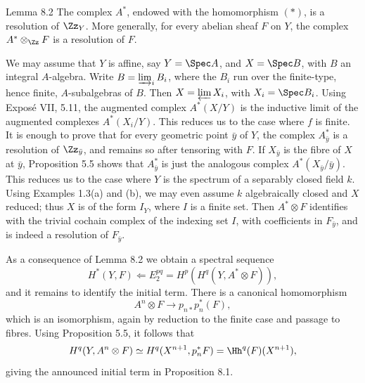 \begin{statement}{Lemma 8.2}
The complex \(A^*\), endowed with the homomorphism \((*)\), is a resolution of \(\Zz_Y\). More generally, for every abelian sheaf \(F\) on \(Y\), the complex \(A^*\otimes_{\Zz}F\) is a resolution of \(F\).
\end{statement}

\begin{prooftext}
We may assume that \(Y\) is affine, say \(Y=\Spec A\), and \(X=\Spec B\), with \(B\) an integral \(A\)-algebra. Write \(B=\varinjlim_iB_i\), where the \(B_i\) run over the finite-type, hence finite, \(A\)-subalgebras of \(B\). Then \(X=\varprojlim X_i\), with \(X_i=\Spec B_i\). Using Expos\'e VII, 5.11, the augmented complex \(A^*(X/Y)\) is the inductive limit of the augmented complexes \(A^*(X_i/Y)\). This reduces us to the case where \(f\) is finite. It is enough to prove that for every geometric point \(\bar y\) of \(Y\), the complex \(A^*_{\bar y}\) is a resolution of \(\Zz_{\bar y}\), and remains so after tensoring with \(F\). If \(X_{\bar y}\) is the fibre of \(X\) at \(\bar y\), Proposition 5.5 shows that \(A^*_{\bar y}\) is just the analogous complex \(A^*(X_{\bar y}/\bar y)\). This reduces us to the case where \(Y\) is the spectrum of a separably closed field \(k\). Using Examples 1.3(a) and (b), we may even assume \(k\) algebraically closed and \(X\) reduced; thus \(X\) is of the form \(I_Y\), where \(I\) is a finite set. Then \(A^*\otimes F\) identifies with the trivial cochain complex of the indexing set \(I\), with coefficients in \(F_{\bar y}\), and is indeed a resolution of \(F_{\bar y}\).
\end{prooftext}

As a consequence of Lemma 8.2 we obtain a spectral sequence
\[
H^*(Y,F)\Longleftarrow E_2^{pq}=H^p(H^q(Y,A^*\otimes F)),
\]
and it remains to identify the initial term. There is a canonical homomorphism
\[
A^n\otimes F\longrightarrow p_{n*}p_n^*(F),
\]
which is an isomorphism, again by reduction to the finite case and passage to fibres. Using Proposition 5.5, it follows that
\[
H^q(Y,A^n\otimes F)\simeq H^q(X^{n+1},p_n^*F)=\Hh^q(F)(X^{n+1}),
\]
giving the announced initial term in Proposition 8.1.

